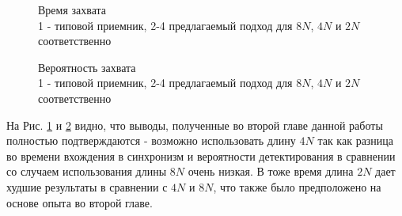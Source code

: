 \begin{figure}[h]
\center{}
	\caption{Время захвата\\ 1 - типовой приемник, 2-4 предлагаемый подход для ${8N}$, ${4N}$ и ${2N}$ соответственно}
	\label{pic:dma5mhz_lockTime}
\end{figure}

\begin{figure}[h]
\center{}
	\caption{Вероятность захвата\\ 1 - типовой приемник, 2-4 предлагаемый подход для ${8N}$, ${4N}$ и ${2N}$ соответственно}
	\label{pic:dma5mhz_probDetection}
\end{figure}

На Рис. \ref{pic:dma5mhz_lockTime} и \ref{pic:dma5mhz_probDetection} видно, что выводы, полученные во второй главе данной работы полностью подтверждаются - возможно использовать
длину ${4N}$ так как разница во времени вхождения в синхронизм и вероятности детектирования в сравнении со случаем использования длины ${8N}$ очень низкая. В тоже время
длина ${2N}$ дает худшие результаты в сравнении с ${4N}$ и ${8N}$, что также было предположено на основе опыта во второй главе.


